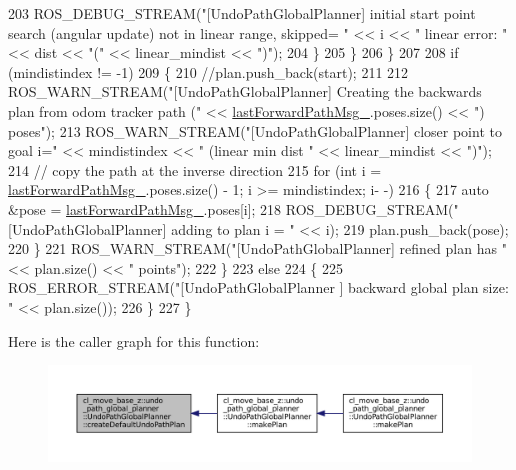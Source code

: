 \begin{DoxyCode}
203                         ROS\_DEBUG\_STREAM(\textcolor{stringliteral}{"[UndoPathGlobalPlanner] initial start point search (angular
       update) not in linear range, skipped= "} << i << \textcolor{stringliteral}{" linear error: "} << dist << \textcolor{stringliteral}{"("} << linear\_mindist << \textcolor{stringliteral}{")"});
204                     \}
205                 \}
206             \}
207 
208             \textcolor{keywordflow}{if} (mindistindex != -1)
209             \{
210                 \textcolor{comment}{//plan.push\_back(start);}
211 
212                 ROS\_WARN\_STREAM(\textcolor{stringliteral}{"[UndoPathGlobalPlanner] Creating the backwards plan from odom tracker path
       ("} << \hyperlink{classcl__move__base__z_1_1undo__path__global__planner_1_1UndoPathGlobalPlanner_a9a4a6e40f5b6cb5f77dedbc5b6170871}{lastForwardPathMsg\_}.poses.size() << \textcolor{stringliteral}{") poses"});
213                 ROS\_WARN\_STREAM(\textcolor{stringliteral}{"[UndoPathGlobalPlanner] closer point to goal i="} << mindistindex << \textcolor{stringliteral}{"
       (linear min dist "} << linear\_mindist << \textcolor{stringliteral}{")"});
214                 \textcolor{comment}{// copy the path at the inverse direction}
215                 \textcolor{keywordflow}{for} (\textcolor{keywordtype}{int} i = \hyperlink{classcl__move__base__z_1_1undo__path__global__planner_1_1UndoPathGlobalPlanner_a9a4a6e40f5b6cb5f77dedbc5b6170871}{lastForwardPathMsg\_}.poses.size() - 1; i >= mindistindex; i-
      -)
216                 \{
217                     \textcolor{keyword}{auto} &pose = \hyperlink{classcl__move__base__z_1_1undo__path__global__planner_1_1UndoPathGlobalPlanner_a9a4a6e40f5b6cb5f77dedbc5b6170871}{lastForwardPathMsg\_}.poses[i];
218                     ROS\_DEBUG\_STREAM(\textcolor{stringliteral}{"[UndoPathGlobalPlanner] adding to plan i = "} << i);
219                     plan.push\_back(pose);
220                 \}
221                 ROS\_WARN\_STREAM(\textcolor{stringliteral}{"[UndoPathGlobalPlanner] refined plan has "} << plan.size() << \textcolor{stringliteral}{"  points"});
222             \}
223             \textcolor{keywordflow}{else}
224             \{
225                 ROS\_ERROR\_STREAM(\textcolor{stringliteral}{"[UndoPathGlobalPlanner ] backward global plan size:  "} << plan.size());
226             \}
227         \}
\end{DoxyCode}
Here is the caller graph for this function\+:
\nopagebreak
\begin{figure}[H]
\begin{center}
\leavevmode
\includegraphics[width=350pt]{classcl__move__base__z_1_1undo__path__global__planner_1_1UndoPathGlobalPlanner_a659c16f439d33ac7026a54bb65c26ca8_icgraph}
\end{center}
\end{figure}
